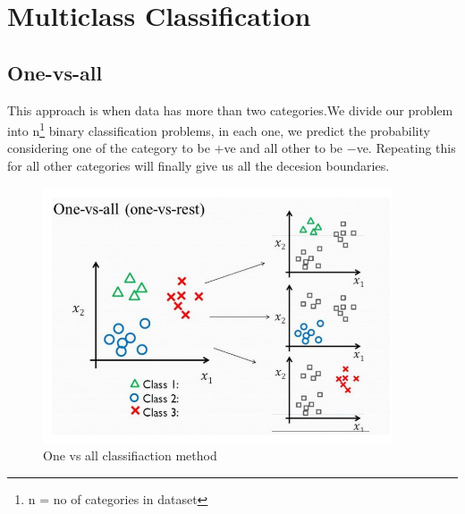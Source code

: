 \documentclass[12pt]{report}
\begin{document}
\section{Multiclass Classification}
  \subsection{One-vs-all}
    This approach is when data has more than two categories.We divide our problem into n\footnote[1]{n = no of categories in dataset} binary classification problems, in each one, we predict the probability considering one of the category to be $+$ve and all other to be $-$ve. Repeating this for all other categories will finally give us all the decesion boundaries.
    \begin{figure}[h]
      \centering
      \includegraphics[scale = 0.3]{oneall.png}
      \caption{One vs all classifiaction method}
    \end{figure}   
\end{document}
